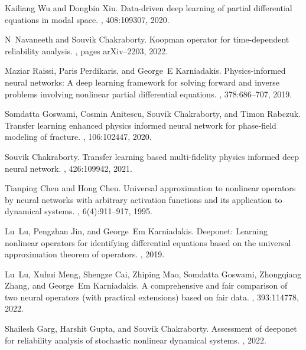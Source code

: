 \documentclass{article}
\begin{document}
\begin{thebibliography}{10}
Kailiang Wu and Dongbin Xiu.
\newblock Data-driven deep learning of partial differential equations in modal
  space.
, 408:109307, 2020.

N~Navaneeth and Souvik Chakraborty.
\newblock Koopman operator for time-dependent reliability analysis.
, pages arXiv--2203, 2022.

Maziar Raissi, Paris Perdikaris, and George~E Karniadakis.
\newblock Physics-informed neural networks: A deep learning framework for
  solving forward and inverse problems involving nonlinear partial differential
  equations.
, 378:686--707, 2019.

Somdatta Goswami, Cosmin Anitescu, Souvik Chakraborty, and Timon Rabczuk.
\newblock Transfer learning enhanced physics informed neural network for
  phase-field modeling of fracture.
, 106:102447, 2020.

Souvik Chakraborty.
\newblock Transfer learning based multi-fidelity physics informed deep neural
  network.
, 426:109942, 2021.

Tianping Chen and Hong Chen.
\newblock Universal approximation to nonlinear operators by neural networks
  with arbitrary activation functions and its application to dynamical systems.
, 6(4):911--917, 1995.

Lu~Lu, Pengzhan Jin, and George~Em Karniadakis.
\newblock Deeponet: Learning nonlinear operators for identifying differential
  equations based on the universal approximation theorem of operators.
, 2019.

Lu~Lu, Xuhui Meng, Shengze Cai, Zhiping Mao, Somdatta Goswami, Zhongqiang
  Zhang, and George~Em Karniadakis.
\newblock A comprehensive and fair comparison of two neural operators (with
  practical extensions) based on fair data.
,
  393:114778, 2022.

Shailesh Garg, Harshit Gupta, and Souvik Chakraborty.
\newblock Assessment of deeponet for reliability analysis of stochastic
  nonlinear dynamical systems.
, 2022.


\end{thebibliography}
\end{document}
